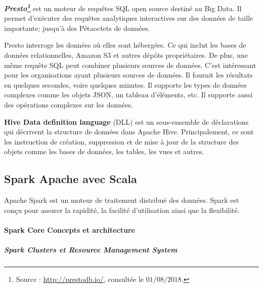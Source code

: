 \begin{tcolorbox}
	\textbf{\textit{Presto\footnote{Source : \url{http://prestodb.io/}, consultée le $01/08/2018$.} }} est un moteur de requêtes SQL open source destiné au Big Data. Il permet d'exécuter des requêtes analytiques interactives sur des données de taille importante; jusqu'à des Pétaoctets de données.
	
	Presto interroge les données où elles sont hébergées. Ce qui inclut les bases de données relationnelles, Amazon S3 et autres dépôts propriétaires. De plus, une même requête SQL peut combiner plusieurs sources de données. C'est intéressant pour les organisations ayant plusieurs sources de données. Il fournit les résultats en quelques secondes, voire quelques minutes.  Il supporte les types de données complexes comme les objets JSON, un tableau d'éléments, etc. Il supporte aussi  des opérations complexes sur les données.
\end{tcolorbox} 


\begin{tcolorbox}
	\textbf{Hive Data definition language} (DLL) est un sous-ensemble de déclarations qui décrivent la structure de données dans Apache Hive.  Principalement, ce sont les instruction de création, suppression et de mise à jour de la structure des objets comme les bases de données, les tables, les vues et autres.
\end{tcolorbox}

\subsection{Spark Apache avec Scala}


Apache Spark est un moteur de traitement distribué des données. Spark est conçu pour assurer la rapidité, la facilité d'utilisation ainsi que la flexibilité.

\paragraph{Spark Core Concepts et architecture}

\subparagraph{Spark Clusters et Resource Management System}

